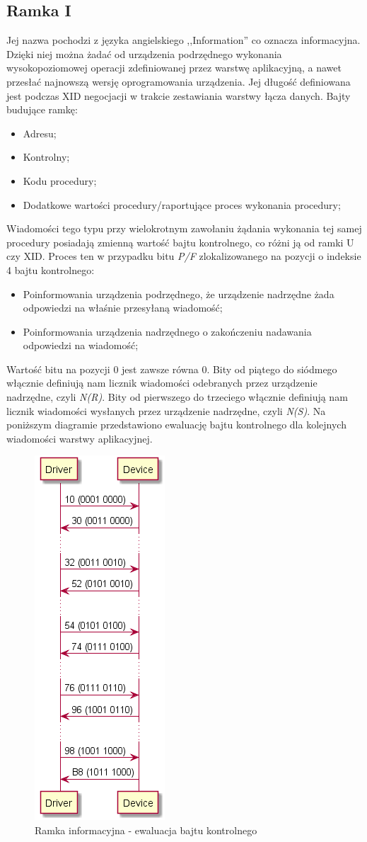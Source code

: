 \subsection{Ramka I}
Jej nazwa pochodzi z języka angielskiego ,,Information'' co oznacza informacyjna.
Dzięki niej można żadać od urządzenia podrzędnego wykonania wysokopoziomowej operacji zdefiniowanej przez warstwę aplikacyjną, a nawet przesłać 
najnowszą wersję oprogramowania urządzenia. Jej długość definiowana jest podczas XID negocjacji w trakcie zestawiania warstwy łącza danych. 
\newline
Bajty budujące ramkę:
\begin{itemize}
	\item Adresu;
	\item Kontrolny;
	\item Kodu procedury;
	\item Dodatkowe wartości procedury/raportujące proces wykonania procedury;
\end{itemize}
Wiadomości tego typu przy wielokrotnym zawołaniu żądania wykonania tej samej procedury posiadają zmienną wartość bajtu kontrolnego, co różni ją od ramki U czy XID. 
\newline
Proces ten w przypadku bitu \textit{P/F} zlokalizowanego na pozycji o indeksie 4 bajtu kontrolnego:
\begin{itemize}
	\item Poinformowania urządzenia podrzędnego, że urządzenie nadrzędne żada odpowiedzi na właśnie przesyłaną wiadomość;
	\item Poinformowania urządzenia nadrzędnego o zakończeniu nadawania odpowiedzi na wiadomość;
\end{itemize}
Wartość bitu na pozycji 0 jest zawsze równa 0. 
Bity od piątego do siódmego włącznie definiują nam licznik wiadomości odebranych przez urządzenie nadrzędne, czyli \textit{N(R)}. 
Bity od pierwszego do trzeciego włącznie definiują nam licznik wiadomości wysłanych przez urządzenie nadrzędne, czyli \textit{N(S)}.
Na poniższym diagramie przedstawiono ewaluację bajtu kontrolnego dla kolejnych wiadomości warstwy aplikacyjnej.
\begin{figure}[h!]
\centering
\includegraphics[scale=1.0]{out/FrameI_Bajt_kontrolny/FrameI_Bajt_kontrolny.png}
\caption{Ramka informacyjna - ewaluacja bajtu kontrolnego}
\end{figure}
